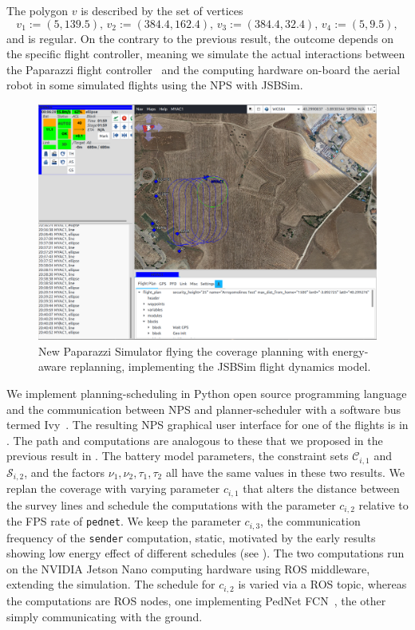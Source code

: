 The polygon $v$ is described by the set of vertices
\begin{equation}
  v_1:=(5,139.5),\,v_2:=(384.4,162.4),\,v_3:=(384.4,32.4),\,v_4:=(5,9.5),
\end{equation}
and is regular. 
On the contrary to the previous result, the outcome depends on the specific flight controller, meaning we simulate the actual interactions between the Paparazzi flight controller~\citep{papa} and the computing hardware on-board the aerial robot in some simulated flights using the NPS with JSBSim. 
\begin{figure}[h!]
  \centering
  \includegraphics[width=.7\textwidth]{pictures/paparazzi}
  \caption[NPS flying the coverage planning ith energy-aware replanning]{New Paparazzi Simulator flying the coverage planning with energy-aware replanning, implementing the JSBSim flight dynamics model.}   
  \label{fig:pprz-screen}
\end{figure}
We implement planning-scheduling in Python open source programming language and the communication between NPS and planner-scheduler with a software bus termed Ivy~\citep{ivybus}. The resulting NPS graphical user interface for one of the flights is in . The path and computations are analogous to these that we proposed in the previous result in . The battery model parameters, the constraint sets $\mathcal{C}_{i,1}$ and $\mathcal{S}_{i,2}$, and the factors $\nu_1,\nu_2,\tau_1,\tau_2$ all have the same values in these two results. We replan the coverage with varying parameter $c_{i,1}$ that alters the distance between the survey lines and schedule the computations with the parameter $c_{i,2}$ relative to the FPS rate of {\small\tt pednet}. We keep the parameter $c_{i,3}$, the communication frequency of the {\small\tt sender} computation, static, motivated by the early results showing low energy effect of different schedules (see ). The two computations run on the NVIDIA Jetson Nano computing hardware using ROS middleware, extending the simulation. The schedule for $c_{i,2}$ is varied via a ROS topic, whereas the computations are ROS nodes, one implementing PedNet FCN~\citep{ullah2018pednet}, the other simply communicating with the ground.


